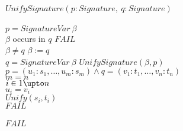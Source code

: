 \begin{algorithmic}[1]
\STATE $UnifySignature(p : Signature,~ q : Signature)$\\
\STATE \nexti\TBEGIN\\
\STATE \nexti\nexti\TIF $p = SignatureVar~\beta$ \TTHEN\\
\STATE \nexti\nexti\nexti\TIF $\beta$ occurs in $q$ \TTHEN $FAIL$\\
\STATE \nexti\nexti\nexti\TELSE\TIF $\beta \neq q$ \TTHEN $\beta := q$\\
\STATE \nexti\nexti\TELSE\TIF $q = SignatureVar~\beta$ \TTHEN $UnifySignature(\beta, p)$\\
\STATE \nexti\nexti\TELSE\TIF $p = (u_1 : s_1, \ldots, u_m : s_m) \land q =
(v_1 : t_1, \ldots, v_n : t_n)$ \TTHEN\\
\STATE \nexti\nexti\nexti\TIF $m = n$ \TTHEN\\
\STATE \nexti\nexti\nexti\nexti\TFOR $i \in 1 \upto n$ \TDO\\
\STATE \nexti\nexti\nexti\nexti\nexti\TIF $u_i = v_i$  \TTHEN\\
\STATE \nexti\nexti\nexti\nexti\nexti\nexti $Unify(s_i, t_i)$\\
\STATE \nexti\nexti\nexti\nexti\nexti\TELSE $FAIL$\\
\STATE \nexti\nexti\nexti\nexti\TEND\\
\STATE \nexti\nexti\nexti\TELSE $FAIL$\\
\STATE \nexti\TEND
\end{algorithmic}
